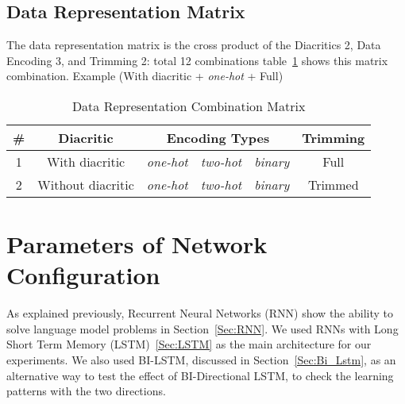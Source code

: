 \subsection{Data Representation Matrix}

The data representation matrix is the cross product of the Diacritics 2, Data Encoding 3, and Trimming 2: total 12 combinations table~\ref{Tab:Data_Representation_Matrix} shows this matrix combination. Example (With diacritic + \textit{one-hot} + Full)


\begin{table}[t]
 \centering
 \begin{tabular}{c c c c c c}
 \hline
 \textbf{\#} & \textbf{Diacritic} & \multicolumn{3}{c}{\textbf{Encoding Types}} & \textbf{Trimming} \\
 
 \hline
 1 & With diacritic & \textit{one-hot} & \textit{two-hot} & \textit{binary} & Full \\
 \hline
 2 & Without diacritic & \textit{one-hot} & \textit{two-hot} & \textit{binary} & Trimmed \\
 \hline
 \end{tabular}
 \caption{Data Representation Combination Matrix}\label{Tab:Data_Representation_Matrix}
\end{table}


%  
\section{Parameters of Network Configuration}\label{Sec:Rnn_Param}

As explained previously, Recurrent Neural Networks (RNN) show the ability to solve language model problems in Section~\ref{Sec:RNN}. We used RNNs with Long Short Term Memory (LSTM)~\ref{Sec:LSTM} as the main architecture for our experiments. We also used BI-LSTM, discussed in Section~\ref{Sec:Bi_Lstm}, as an alternative way to test the effect of BI-Directional LSTM, to check the learning patterns with the two directions.

